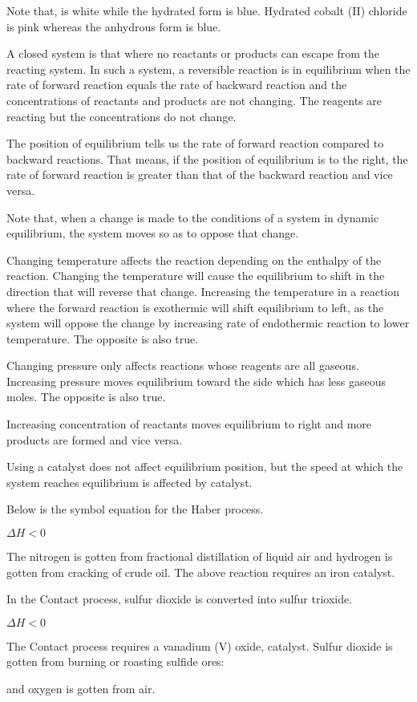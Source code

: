 Note that,  is white while the hydrated form  is blue. Hydrated cobalt (II)
chloride is pink whereas the anhydrous form is blue.

A closed system is that where no reactants or products can escape from the reacting system. In such
a system, a reversible reaction is in equilibrium when the rate of forward reaction equals the
rate of backward reaction and the concentrations of reactants and products are not changing. The
reagents are reacting but the concentrations do not change.

The position of equilibrium tells us the rate of forward reaction compared to backward reactions.
That means, if the position of equilibrium is to the right, the rate of forward reaction is greater
than that of the backward reaction and vice versa.

Note that, when a change is made to the conditions of a system in dynamic equilibrium, the system 
moves so as to oppose that change.

Changing temperature affects the reaction depending on the enthalpy of the reaction. Changing the
temperature will cause the equilibrium to shift in the direction that will reverse that change.
Increasing the temperature in a reaction where the forward reaction is exothermic will shift 
equilibrium to left, as the system will oppose the change by increasing rate of endothermic 
reaction to lower temperature. The opposite is also true.

Changing pressure only affects reactions whose reagents are all gaseous. Increasing pressure moves
equilibrium toward the side which has less gaseous moles. The opposite is also true.

Increasing concentration of reactants moves equilibrium to right and more products are formed and
vice versa.

Using a catalyst does not affect equilibrium position, but the speed at which the system reaches 
equilibrium is affected by catalyst.

Below is the symbol equation for the Haber process.
\begin{center}
	 $\Delta H < 0$
\end{center}
The nitrogen is gotten from fractional distillation of liquid air and hydrogen is gotten from 
cracking of crude oil. The above reaction requires an iron catalyst.

In the Contact process, sulfur dioxide is converted into sulfur trioxide.
\begin{center}
	 $\Delta H < 0$
\end{center}
The Contact process requires a vanadium (V) oxide,  catalyst. Sulfur dioxide is gotten
from burning or roasting sulfide ores:
\begin{center}
\end{center}
and oxygen is gotten from air.

